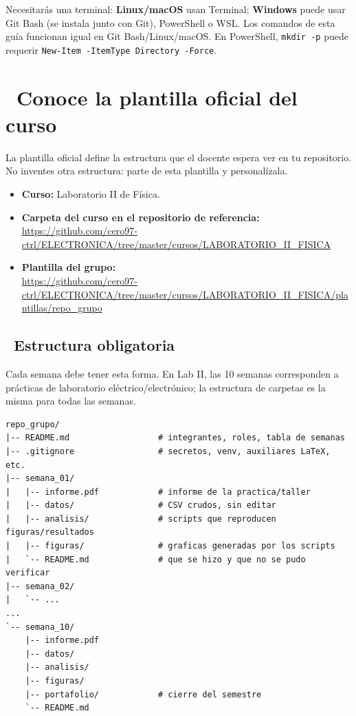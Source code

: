 \documentclass[11pt,a4paper]{article}
\newcommand{\iconotexto}[2]{\textcolor{cyanNeon}{\faIcon{#1}}~#2}
\begin{document}
\begin{cajaRecuerda}
Necesitarás una terminal: \textbf{Linux/macOS} usan Terminal; \textbf{Windows} puede usar Git Bash (se instala junto con Git), PowerShell o WSL. Los comandos de esta guía funcionan igual en Git Bash/Linux/macOS. En PowerShell, \texttt{mkdir -p} puede requerir \texttt{New-Item -ItemType Directory -Force}.
\end{cajaRecuerda}

\section{\iconotexto{sitemap}{Conoce la plantilla oficial del curso}}

La plantilla oficial define la estructura que el docente espera ver en tu repositorio. No inventes otra estructura: parte de esta plantilla y personalízala.

\begin{tcolorbox}[tarjetaDato,title={\faIcon{github}~Ubicación de la plantilla}]
\begin{itemize}[leftmargin=1.4em,itemsep=4pt,topsep=2pt]
  \item \textbf{Curso:} Laboratorio II de Física.
  \item \textbf{Carpeta del curso en el repositorio de referencia:}\\
  \url{https://github.com/cero97-ctrl/ELECTRONICA/tree/master/cursos/LABORATORIO_II_FISICA}
  \item \textbf{Plantilla del grupo:}\\
  \url{https://github.com/cero97-ctrl/ELECTRONICA/tree/master/cursos/LABORATORIO_II_FISICA/plantillas/repo_grupo}
\end{itemize}
\end{tcolorbox}

\subsection{\iconotexto{folder-open}{Estructura obligatoria}}

Cada semana debe tener esta forma. En Lab II, las 10 semanas corresponden a prácticas de laboratorio eléctrico/electrónico; la estructura de carpetas es la misma para todas las semanas.

\begin{lstlisting}
repo_grupo/
|-- README.md                  # integrantes, roles, tabla de semanas
|-- .gitignore                 # secretos, venv, auxiliares LaTeX, etc.
|-- semana_01/
|   |-- informe.pdf            # informe de la practica/taller
|   |-- datos/                 # CSV crudos, sin editar
|   |-- analisis/              # scripts que reproducen figuras/resultados
|   |-- figuras/               # graficas generadas por los scripts
|   `-- README.md              # que se hizo y que no se pudo verificar
|-- semana_02/
|   `-- ...
...
`-- semana_10/
    |-- informe.pdf
    |-- datos/
    |-- analisis/
    |-- figuras/
    |-- portafolio/            # cierre del semestre
    `-- README.md
\end{lstlisting}
\end{document}
